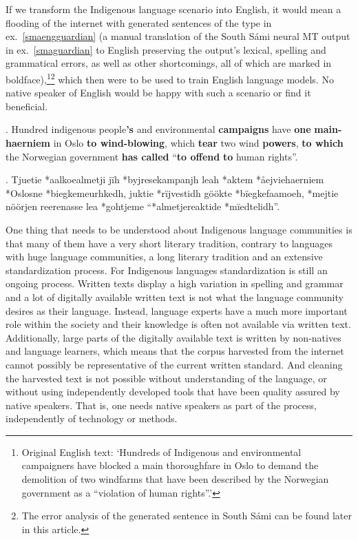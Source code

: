 \documentclass[free]{flammie}
\begin{document}
If we transform the Indigenous language scenario into English, it would mean a
flooding of the internet with generated sentences of the type in
ex.~\ref{smaengguardian} (a manual translation of the South Sámi neural MT
output in ex.~\ref{smaguardian} to English preserving the output's lexical,
spelling and grammatical errors, as well as other shortcomings, all of which are
marked in boldface),\footnote{Original English text: `Hundreds of Indigenous and
environmental campaigners have blocked a main thoroughfare in Oslo to demand the
demolition of two windfarms that have been described by the Norwegian government
as a ``violation of human rights''.'}\footnote{The error analysis of the generated
sentence in South Sámi can be found later in this article.} which then were to
be used to train English language models. No native speaker of English would be
happy with such a scenario or find it beneficial.

\ex. Hundred indigenous people\textbf{'s} and environmental \textbf{campaigns}
have \textbf{one} \textbf{main-haerniem} in Oslo \textbf{to wind-blowing}, which
\textbf{tear} two wind \textbf{powers}, \textbf{to which} the Norwegian
government \textbf{has called} ``\textbf{to offend} \textbf{to} human
rights''.\label{smaengguardian}

\ex. Tjuetie *aalkoealmetji jïh *byjresekampanjh leah *aktem *åejviehaerniem
*Oslosne *biegkemeurhkedh, juktie *rïjvestidh göökte *bïegkefaamoeh, *mejtie
nöörjen reerenasse lea *gohtjeme ``*almetjereaktide
*mïedtelidh''.\label{smaguardian}

One thing that needs to be understood about Indigenous language communities is
that many of them have a very short literary tradition, contrary to languages
with huge language communities, a long literary tradition and an extensive
standardization process. For Indigenous languages standardization is still an
ongoing process. Written texts display a high variation in spelling and grammar
and a lot of digitally available written text is not what the language community
desires as their language. Instead, language experts have a much more important
role within the society and their knowledge is often not available via written
text.  Additionally, large parts of the digitally available text is written by
non-natives and language learners, which means that the corpus harvested from
the internet cannot possibly be representative of the current written standard.
And cleaning the harvested text is not possible without understanding of the
language, or without using independently developed tools that have been quality
assured by native speakers. That is, one needs native speakers as part of the
process, independently of technology or methods.
\end{document}
